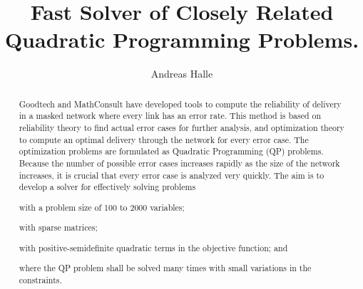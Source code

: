 \documentclass[a4paper,12pt]{report}
\begin{document}
\newcommand*\printpoint[2]{(%
\pgfmathparse{0.03514598035*#1}\pgfmathprintnumber{\pgfmathresult},%
\pgfmathparse{0.03514598035*#2}\pgfmathprintnumber{\pgfmathresult})%
}

\title{Fast Solver of Closely Related Quadratic Programming
       Problems.}

\author{Andreas Halle}
\maketitle
\thispagestyle{empty}
\newpage

\thispagestyle{empty}
\begin{abstract}
Goodtech and MathConsult have developed tools to compute the reliability of
delivery in a masked network where every link has an error rate.
This method is based on reliability theory to find actual error cases for
further analysis, and optimization theory to compute an optimal delivery
through the network for every error case.
The optimization problems are formulated as Quadratic Programming (QP)
problems.
Because the number of possible error cases increases rapidly as the size of the
network increases, it is crucial that every error case is analyzed very
quickly.
The aim is to develop a solver for effectively solving problems
\begin{inparaenum}
  \item with a problem size of 100 to 2000 variables;
  \item with sparse matrices;
  \item with positive-semidefinite quadratic terms in the objective function;
        and
  \item where the QP problem shall be solved many times with small variations
        in the constraints.
\end{inparaenum}
\end{abstract}
\newpage

\setcounter{page}{3}
\tableofcontents
\newpage
\end{document}

